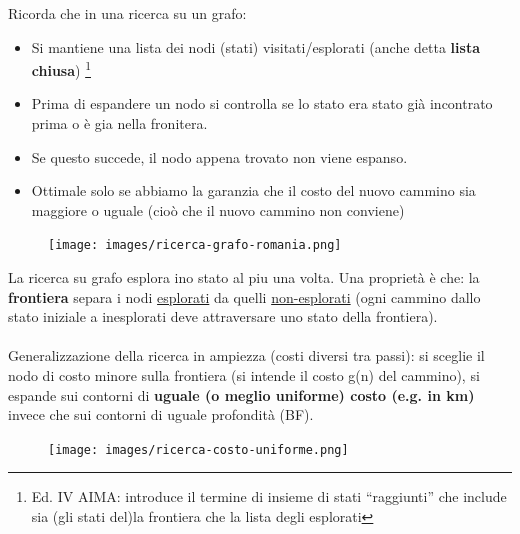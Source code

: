 \begin{note}
	Ricorda che in una ricerca su un grafo:
	\begin{itemize}
		\item Si mantiene una lista dei nodi (stati) visitati/esplorati (anche detta \textbf{lista chiusa}) \footnote{Ed. IV AIMA: introduce il termine di insieme di stati “raggiunti”
		che include sia (gli stati del)la frontiera che la lista degli esplorati}
		\item Prima di espandere un nodo si controlla se lo stato era stato già incontrato prima o è gia nella fronitera.
		\item Se questo succede, il nodo appena trovato non viene espanso.
		\item Ottimale solo se abbiamo la garanzia che il costo del nuovo cammino sia maggiore o uguale (cioò che il nuovo cammino non conviene)
	\end{itemize}
\end{note}
\begin{figure}[h!]
	\centering
	\texttt{[image: images/ricerca-grafo-romania.png]}
\end{figure}
\hspace{-15pt}La ricerca su grafo esplora ino stato al piu una volta. Una proprietà è che:
la \textbf{frontiera} separa i nodi \underline{esplorati} da quelli \underline{non-esplorati} (ogni cammino dallo
stato iniziale a inesplorati deve attraversare uno stato della frontiera).\\\\
Generalizzazione della ricerca in ampiezza (costi diversi tra passi): si sceglie il
nodo di costo minore sulla frontiera (si intende il costo g(n) del cammino), si
espande sui contorni di \textbf{uguale (o meglio uniforme) costo (e.g. in km)} invece
che sui contorni di uguale profondità (BF).
\begin{figure}[h!]
	\centering
	\texttt{[image: images/ricerca-costo-uniforme.png]}
\end{figure}

